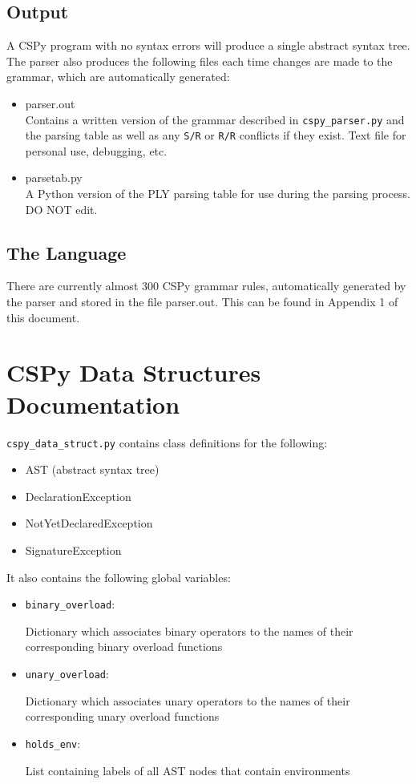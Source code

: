 \documentclass{article}
\begin{document}
\subsection{Output}
A CSPy program with no syntax errors will produce a single abstract syntax tree. The parser also produces the following files each time changes are made to the grammar, which are automatically generated:
\begin{itemize}
\item parser.out \\
Contains a written version of the grammar described in \verb|cspy_parser.py| and the parsing table as well as any \verb|S/R| or \verb|R/R| conflicts if they exist. Text file for personal use, debugging, etc.
\item parsetab.py \\
A Python version of the PLY parsing table for use during the parsing process. DO NOT edit.
\end{itemize}
\subsection{The Language}
There are currently almost 300 CSPy grammar rules, automatically generated by the parser and stored in the file parser.out. This can be found in Appendix 1 of this document.
\pagebreak
\section{CSPy Data Structures Documentation}
\verb|cspy_data_struct.py| contains class definitions for the following:
\begin{itemize}
\item AST (abstract syntax tree)
\item DeclarationException
\item NotYetDeclaredException
\item SignatureException \\
\end{itemize}

It also contains the following global variables:
\begin{itemize}
\item \verb|binary_overload|: 

Dictionary which associates binary operators to the names of their
corresponding binary overload functions
\item \verb|unary_overload|: 

Dictionary which associates unary operators to the names of their
corresponding unary overload functions
\item \verb|holds_env|: 

List containing labels of all AST nodes that contain environments
\end{itemize}
\end{document}
